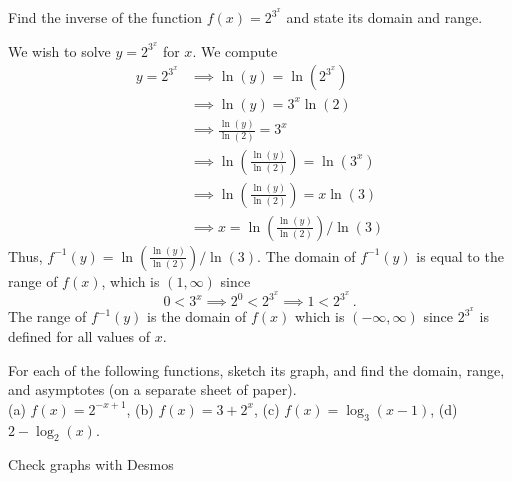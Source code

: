 \documentclass[11pt]{exam}
\begin{document}
\begin{questions}
    \question Find the inverse of the function \(f(x) = 2^{3^x}\) and
    state its domain and range.
    \begin{solution}
      We wish to solve \(y = 2^{3^x}\) for \(x\). We compute
      \begin{align*}
        y = 2^{3^x}
        & \implies \ln(y) = \ln(2^{3^x}) \\
        & \implies \ln(y) = 3^x \ln(2) \\
        & \implies \frac{\ln(y)}{\ln(2)} = 3^x\\
        & \implies \ln \left(\frac{\ln(y)}{\ln(2)}  \right) = \ln(3^x)
        \\
        & \implies  \ln \left(\frac{\ln(y)}{\ln(2)}  \right) = x
          \ln(3)\\
        & \implies  x = \ln \left(\frac{\ln(y)}{\ln(2)}  \right)/\ln(3)
      \end{align*}
      Thus, \(f^{-1}(y) = \ln \left(\frac{\ln(y)}{\ln(2)}
      \right)/\ln(3)\). The domain of \(f^{-1}(y)\) is equal to the
      range of \(f(x)\), which is \((1,\infty)\) since \[
        0 < 3^x \implies 2^0 < 2^{3^x} \implies 1 < 2^{3^x} \,.
      \]
      The range of \(f^{-1}(y)\) is the domain of \(f(x)\) which is
      \((-\infty,\infty)\) since \(2^{3^x}\) is defined for all values
      of \(x\).
    \end{solution}
    \vspace{0.75in}
    \question For each of the following functions, sketch its graph,
    and find the domain, range, and asymptotes (on a separate sheet of
    paper). \\
    (a) \(f(x) = 2^{-x+1}\), (b) \(f(x)=3+2^x\), (c) \(f(x) =
    \log_3(x-1)\), (d)  \(2-\log_2(x)\).
    \begin{solution}
      Check graphs with Desmos
 

\end{solution}
\end{questions}
\end{document}
